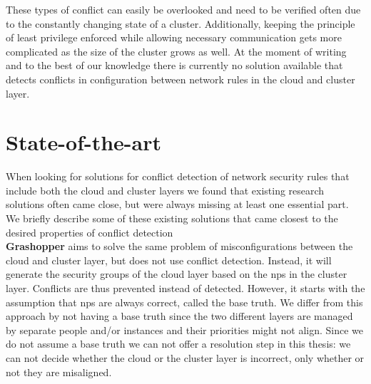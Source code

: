 These types of conflict can easily be overlooked and need to be verified often due to the constantly changing state of a cluster. Additionally, keeping the principle of least privilege enforced while allowing necessary communication gets more complicated as the size of the cluster grows as well. At the moment of writing and to the best of our knowledge there is currently no solution available that detects conflicts in configuration between network rules in the cloud and cluster layer.
\\[10pt]

\section{State-of-the-art} \label{sec:stateoftheart}
When looking for solutions for conflict detection of network security rules that include both the cloud and cluster layers we found that existing research solutions often came close, but were always missing at least one essential part. We briefly describe some of these existing solutions that came closest to the desired properties of conflict detection
\\[10pt]

\textbf{Grashopper} \cite{grashopper}  aims to solve the same problem of misconfigurations between the cloud and cluster layer, but does not use conflict detection. Instead, it will generate the security groups of the cloud layer based on the \acrshort{np}s in the cluster layer. Conflicts are thus prevented instead of detected. However, it starts with the assumption that \acrshort{np}s are always correct, called the base truth. We differ from this approach by not having a base truth since the two different layers are managed by separate people and/or instances and their priorities might not align. Since we do not assume a base truth we can not offer a resolution step in this thesis: we can not decide whether the cloud or the cluster layer is incorrect, only whether or not they are misaligned.
\\[10pt]

